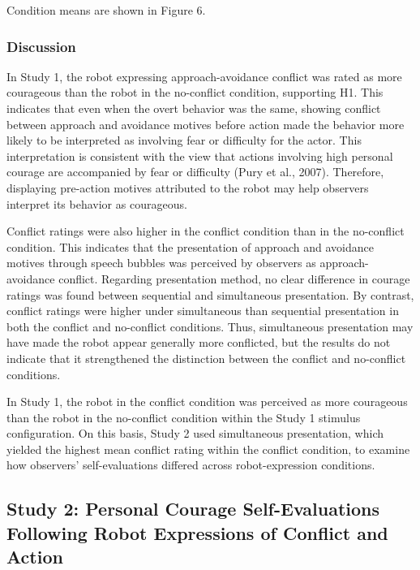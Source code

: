 Condition means are shown in Figure 6.

\subsubsection{Discussion}\label{discussion}

In Study 1, the robot expressing approach-avoidance conflict was rated
as more courageous than the robot in the no-conflict condition,
supporting H1. This indicates that even when the overt behavior was the
same, showing conflict between approach and avoidance motives before
action made the behavior more likely to be interpreted as involving fear
or difficulty for the actor. This interpretation is consistent with the
view that actions involving high personal courage are accompanied by
fear or difficulty (Pury et al., 2007). Therefore, displaying pre-action
motives attributed to the robot may help observers interpret its
behavior as courageous.

Conflict ratings were also higher in the conflict condition than in the
no-conflict condition. This indicates that the presentation of approach
and avoidance motives through speech bubbles was perceived by observers
as approach-avoidance conflict. Regarding presentation method, no clear
difference in courage ratings was found between sequential and
simultaneous presentation. By contrast, conflict ratings were higher
under simultaneous than sequential presentation in both the conflict and
no-conflict conditions. Thus, simultaneous presentation may have made
the robot appear generally more conflicted, but the results do not
indicate that it strengthened the distinction between the conflict and
no-conflict conditions.

In Study 1, the robot in the conflict condition was perceived as more
courageous than the robot in the no-conflict condition within the Study
1 stimulus configuration. On this basis, Study 2 used simultaneous
presentation, which yielded the highest mean conflict rating within the
conflict condition, to examine how observers' self-evaluations differed
across robot-expression conditions.

\subsection{Study 2: Personal Courage Self-Evaluations Following Robot
Expressions of Conflict and
Action}\label{study-2-personal-courage-self-evaluations-following-robot-expressions-of-conflict-and-action}

